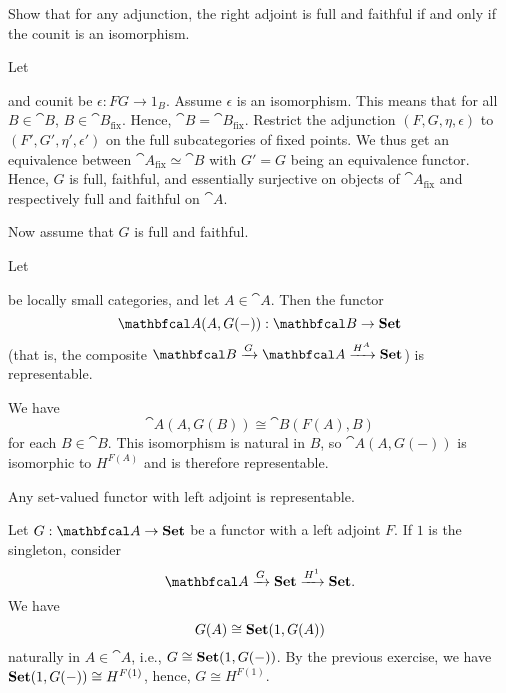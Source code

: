 \documentclass[11pt,a4paper]{article}
\begin{document}
\begin{exercise}
    Show that for any adjunction, the right adjoint is full and faithful if and only if the counit is an isomorphism.
\end{exercise}
\begin{solution}
    Let  and counit be $\epsilon: FG\to 1_B$. Assume $\epsilon$ is an isomorphism. This means that for all $B\in\cat{B}$, $B\in\cat{B}_{\text{fix}}$. Hence, $\cat{B}=\cat{B}_{\text{fix}}$. Restrict the adjunction $(F,G,\eta,\epsilon)$ to $(F',G',\eta',\epsilon')$ on the full subcategories of fixed points. We thus get an equivalence between $\cat{A}_{\text{fix}}\simeq \cat{B}$ with $G'=G$ being an equivalence functor. Hence, $G$ is full, faithful, and essentially surjective on objects of $\cat{A}_{\text{fix}}$ and respectively full and faithful on $\cat{A}$.\par
    Now assume that $G$ is full and faithful.
\end{solution}

\begin{exercise}
    Let  be locally small categories, and let $A\in\cat{A}$. Then the functor
    \begin{equation*}
        \cat{A}(A,G(-)): \cat{B}\to\bcat{Set}
    \end{equation*}
    (that is, the composite $\cat{B} \xrightarrow{G} \cat{A} \xrightarrow{H^A} \bcat{Set}$) is representable.
\end{exercise}
\begin{solution}
    We have
    \begin{equation*}
        \cat{A}(A,G(B))\cong \cat{B}(F(A),B)
    \end{equation*}
    for each $B\in\cat{B}$. This isomorphism is natural in $B$, so $\cat{A}(A,G(-))$ is isomorphic to $H^{F(A)}$ and is therefore representable.
\end{solution}

\begin{exercise}
    Any set-valued functor with left adjoint is representable.
\end{exercise}
\begin{solution}
    Let $G:\cat{A}\to\bcat{Set}$ be a functor with a left adjoint $F$. If $1$ is the singleton, consider
    \begin{equation*}
        \cat{A}\xrightarrow{G}\bcat{Set}\xrightarrow{H^1}\bcat{Set}.
    \end{equation*}
    We have
    \begin{equation*}
        G(A)\cong\mathbf{Set}(1,G(A))
    \end{equation*}
    naturally in $A\in\cat{A}$, i.e., $G\cong \mathbf{Set}(1,G(-))$. By the previous exercise, we have $\mathbf{Set}(1,G(-))\cong H^{F(1)}$, hence, $G\cong H^{F(1)}$.
\end{solution}
\end{document}
